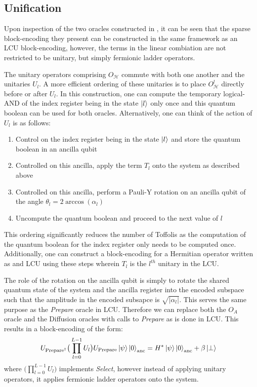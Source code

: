 \subsection{Unification}
\label{subsec:unification}

Upon inspection of the two oracles constructed in \cite{liu2024efficient}, it can be seen that the sparse block-encoding they present can be constructed in the same framework as an LCU block-encoding, however, the terms in the linear combiation are not restricted to be unitary, but simply fermionic ladder operators.

The unitary operators comprising $O_\mathcal{H}$ commute with both one another and the unitaries $U_l$. 
A more efficient ordering of these unitaries is to place $O_\mathcal{H}^l$ directly before or after $U_l$.
In this construction, one can compute the temporary logical-AND of the index register being in the state $\ket{l}$ only once and this quantum boolean can be used for both oracles.
Alternatively, one can think of the action of $U_l$ is as follows:
\begin{enumerate}
    \item Control on the index register being in the state $\ket{l}$ and store the quantum boolean in an ancilla qubit
    \item Controlled on this ancilla, apply the term $T_l$ onto the system as described above
    \item Controlled on this ancilla, perform a Pauli-Y rotation on an ancilla qubit of the angle $\theta_l = 2\arccos(\alpha_l)$
    \item Uncompute the quantum boolean and proceed to the next value of $l$
\end{enumerate}
This ordering significantly reduces the number of Toffolis as the computation of the quantum boolean for the index register only needs to be computed once.
Additionally, one can construct a block-encoding for a Hermitian operator written as and LCU using these steps wherein $T_l$ is the $l^{th}$ unitary in the LCU.

The role of the rotation on the ancilla qubit is simply to rotate the shared quantum state of the system and the ancilla register into the encoded subspace such that the amplitude in the encoded subsapce is $\sqrt{| \alpha_l |}$.
This serves the same purpose as the \textit{Prepare} oracle in LCU.
Therefore we can replace both the $O_A$ oracle and the Diffusion oracles with calls to \textit{Prepare} as is done in LCU.
This results in a block-encoding of the form:
\begin{equation}
    U_{\text{Prepare}^\dagger} \big( \prod_{l=0}^{L-1} U_l \big) U_{\text{Prepare}} \ket{\psi} \ket{0}_{\text{anc}} = H^* \ket{\psi} \ket{0}_{\text{anc}} + \beta \ket{\perp}
\end{equation}
where $\big( \prod_{l=0}^{L-1} U_l \big)$ implements \textit{Select}, however instead of applying unitary operators, it applies fermionic ladder operators onto the system.

